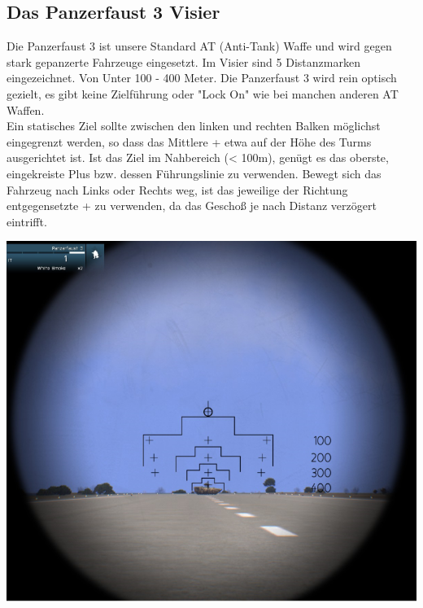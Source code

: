 \subsection{Das Panzerfaust 3 Visier}
Die Panzerfaust 3 ist unsere Standard AT (Anti-Tank) Waffe und wird gegen stark gepanzerte Fahrzeuge eingesetzt. Im Visier sind 5 Distanzmarken eingezeichnet. Von Unter 100 - 400 Meter. Die Panzerfaust 3 wird rein optisch gezielt, es gibt keine Zielführung oder "Lock On" wie bei manchen anderen AT Waffen. \\
 Ein statisches Ziel sollte zwischen den linken und rechten Balken möglichst eingegrenzt werden, so dass das Mittlere + etwa auf der Höhe des Turms ausgerichtet ist. Ist das Ziel im Nahbereich (< 100m), genügt es das oberste, eingekreiste Plus bzw. dessen Führungslinie zu verwenden. Bewegt sich das Fahrzeug nach Links oder Rechts weg, ist das jeweilige der Richtung entgegensetzte + zu verwenden, da das Geschoß je nach Distanz verzögert eintrifft. \\
\begin{minipage}[t]{1\textwidth}
\includegraphics[width=\textwidth]{./Grafiken/Abschnitt/Panzerfaust_Visier.png}
\end{minipage}

